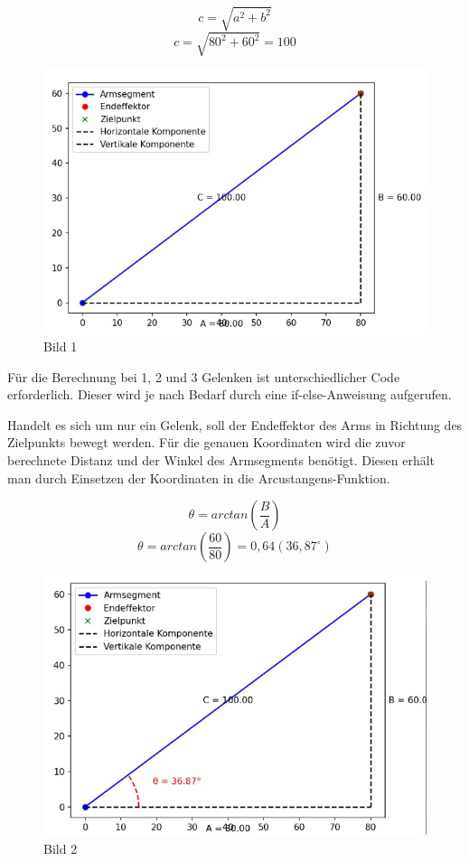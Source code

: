 \documentclass[12pt]{article}
\begin{document}
    \[
        c = \sqrt{a^2 + b^2}
    \]
    \[
        c = \sqrt{80^2 + 60^2} = 100
    \]

    \begin{figure}[h]
        \centering
        \includegraphics[width = \linewidth]{Bild 1}
        \caption{Bild 1}
    \end{figure}

    Für die Berechnung bei 1, 2 und 3 Gelenken ist unterschiedlicher Code erforderlich. Dieser wird je
    nach Bedarf durch eine if-else-Anweisung aufgerufen.

    Handelt es sich um nur ein Gelenk, soll der Endeffektor des Arms in Richtung des Zielpunkts
    bewegt werden. Für die genauen Koordinaten wird die zuvor berechnete Distanz und der Winkel des
    Armsegments benötigt. Diesen erhält man durch Einsetzen der Koordinaten in die
    Arcustangens-Funktion.

    \[
        \theta=arctan(\frac{B}{A})
    \]
    \[
        \theta=arctan(\frac{60}{80})=0,64 (36,87^\circ)
    \]

    \begin{figure}[h]
        \centering
        \includegraphics[width = \linewidth]{Bild 2}
        \caption{Bild 2}
    \end{figure}
\end{document}
